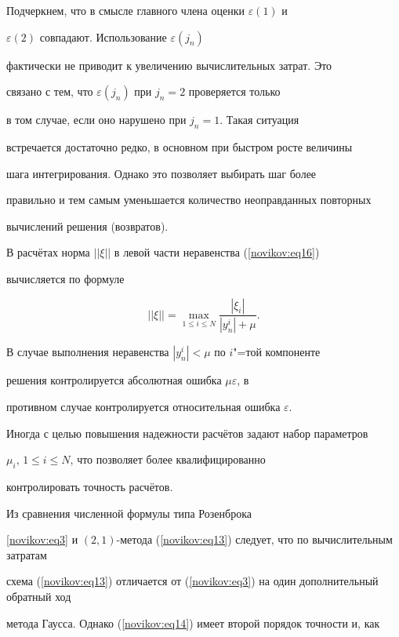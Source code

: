 Подчеркнем, что в смысле главного члена оценки $\varepsilon(1)$ и

$\varepsilon(2)$ совпадают. Использование $\varepsilon(j_n)$

фактически не приводит к увеличению вычислительных затрат. Это

связано с тем, что $\varepsilon(j_n)$ при $j_n=2$ проверяется только

в том случае, если оно нарушено при $j_n =1$. Такая ситуация

встречается достаточно редко, в основном при быстром росте величины

шага интегрирования. Однако это позволяет выбирать шаг более

правильно и тем самым уменьшается количество неоправданных повторных

вычислений решения (возвратов).



В расчётах норма $||\xi||$ в левой части неравенства (\ref{novikov:eq16})

вычисляется по формуле

\begin{equation*}

||\xi||=\max_{1\leq i\leq N}\frac{|\xi_i|}{|y^i_n|+\mu}.

\end{equation*}

В случае выполнения неравенства $|y^i_n|<\mu$ по $i$"=той компоненте

решения контролируется абсолютная ошибка $\mu\varepsilon$, в

противном случае контролируется относительная ошибка $\varepsilon$.

Иногда с целью повышения надежности расчётов задают набор параметров

$\mu_i$, $1\leq i \leq N$, что позволяет более квалифицированно

контролировать точность расчётов.



\smallskip



 Из сравнения численной формулы типа Розенброка

\eqref{novikov:eq3} и $(2, 1)$-метода (\ref{novikov:eq13}) следует, что по вычислительным затратам

схема (\ref{novikov:eq13}) отличается от (\ref{novikov:eq3}) на один дополнительный обратный ход

метода Гаусса. Однако (\ref{novikov:eq14}) имеет второй порядок точности и, как

